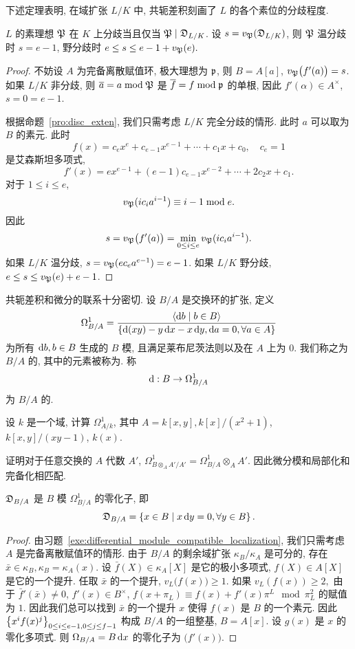 下述定理表明, 在域扩张 $L/K$ 中, 共轭差积刻画了 $L$ 的各个素位的分歧程度. 
\begin{theorem}{}{}
$L$ 的素理想 ${\mathfrak{P}}$ 在 $K$ 上分歧当且仅当 ${\mathfrak{P}}\mid {\mathfrak{D}}_{L/K}$. 设 $s=v_{\mathfrak{P}}({\mathfrak{D}}_{L/K})$, 则 ${\mathfrak{P}}$ 温分歧时 $s=e-1$, 野分歧时 $e\le s\le e-1+v_{\mathfrak{P}}(e).$
\end{theorem}
\begin{proof}
不妨设 $A$ 为完备离散赋值环, 极大理想为 ${\mathfrak{p}}$, 则 $B=A[a]$, $v_{\mathfrak{P}}\bigl(f'(a)\bigr)=s$. 如果 $L/K$ 非分歧, 则 $\overline a=a\bmod{\mathfrak{P}}$ 是 $\overline f=f\bmod{\mathfrak{p}}$ 的单根, 因此 $f'(\alpha)\in A^\times$, $s=0=e-1$.

根据命题~\ref{pro:disc_exten}, 我们只需考虑 $L/K$ 完全分歧的情形. 此时 $a$ 可以取为 $B$ 的素元. 此时
  \[f(x)=c_ex^e+c_{e-1}x^{e-1}+\cdots+c_1x+c_0,\quad c_e=1\]
是艾森斯坦多项式,
  \[f'(x)=ex^{e-1}+(e-1)c_{e-1}x^{e-2}+\cdots+2c_2x+c_1.\]
对于 $1\le i\le e$,
  \[v_{\mathfrak{P}}(i c_i a^{i-1})\equiv i-1 \bmod e.\]
因此
  \[s=v_{\mathfrak{P}}\bigl(f'(a)\bigr)=\min_{0\le i\le e}v_{\mathfrak{P}}(i c_i a^{i-1}).\]
如果 $L/K$ 温分歧, $s=v_{\mathfrak{P}}(ec_e a^{e-1})=e-1$. 如果 $L/K$ 野分歧, $e\le s\le v_{\mathfrak{P}}(e)+e-1$.
\end{proof}

共轭差积和微分的联系十分密切. 设 $B/A$ 是交换环的扩张, 定义
  \[\Omega^1_{B/A}=\frac{\langle{\mathop{}\!\mathrm{d}b\mid b\in B}\rangle}{\left\{\mathop{}\!\mathrm{d}(xy)-y\mathop{}\!\mathrm{d} x-x\mathop{}\!\mathrm{d} y,\mathop{}\!\mathrm{d} a=0,\forall a\in A\right\}}\]
为所有 $\mathop{}\!\mathrm{d} b,b\in B$ 生成的 $B$ 模, 且满足莱布尼茨法则以及在 $A$ 上为 $0$. 我们称之为 $B/A$ 的, 其中的元素被称为. 称
  \[\mathop{}\!\mathrm{d}: B\to \Omega^1_{B/A}\]
为 $B/A$ 的.

\begin{exercise}
设 $k$ 是一个域, 计算 $\Omega^1_{A/k}$, 其中 $A=k[x,y], k[x]/(x^2+1)$, $k[x,y]/(xy-1)$, $k(x).$
\end{exercise}

\begin{exercise}\label{exe:differential_module_compatible_localization}
证明对于任意交换的 $A$ 代数 $A'$, $\Omega^1_{B\otimes_A A'/A'}=\Omega^1_{B/A}\otimes_A A'$. 因此微分模和局部化和完备化相匹配.
\end{exercise}

\begin{proposition}{}{}
${\mathfrak{D}}_{B/A}$ 是 $B$ 模 $\Omega_{B/A}^1$ 的零化子, 即
  \[{\mathfrak{D}}_{B/A}=\left\{x\in B\mid x\mathop{}\!\mathrm{d} y=0,\forall y\in B\right\}.\]
\end{proposition}
\begin{proof}
由习题~\ref{exe:differential_module_compatible_localization}, 我们只需考虑 $A$ 是完备离散赋值环的情形. 由于 $B/A$ 的剩余域扩张 $\kappa_B/\kappa_A$ 是可分的, 存在 $\bar x\in \kappa_B,\kappa_B=\kappa_A(x)$. 设 $\bar f(X)\in\kappa_A[X]$ 是它的极小多项式, $f(X)\in A[X]$ 是它的一个提升. 任取 $\bar x$ 的一个提升, $v_L\bigl(f(x)\bigr)\ge 1$. 如果 $v_L(f(x))\ge 2,$ 由于 $\bar f'(\bar x)\neq 0$, $f'(x)\in B^\times$, $f(x+\pi_L)\equiv f(x)+f'(x)\pi^L\mod \pi_L^2$ 的赋值为 $1$. 因此我们总可以找到 $\bar x$ 的一个提升 $x$ 使得 $f(x)$ 是 $B$ 的一个素元. 因此 $\left\{x^i f(x)^j\right\}_{0\le i\le e-1,0\le j\le f-1}$ 构成 $B/A$ 的一组整基, $B=A[x]$. 设 $g(x)$ 是 $x$ 的零化多项式. 则 $\Omega_{B/A}=B\mathop{}\!\mathrm{d} x$ 的零化子为 $\bigl(f'(x)\bigr)$.
\end{proof}

